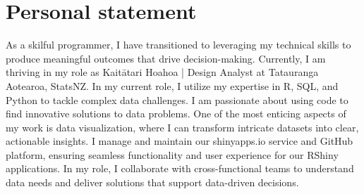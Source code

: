 \section{Personal statement}
As a skilful programmer, I have transitioned to leveraging my technical skills to produce meaningful outcomes that drive decision-making. 
Currently, I am thriving in my role as Kaitātari Hoahoa | Design Analyst at Tatauranga Aotearoa, StatsNZ. 
In my current role, I utilize my expertise in R, SQL, and Python to tackle complex data challenges. 
I am passionate about using code to find innovative solutions to data problems.
One of the most enticing aspects of my work is data visualization, where I can transform intricate datasets into clear, actionable insights. 
I manage and maintain our shinyapps.io service and GitHub platform, ensuring seamless functionality and user experience for our RShiny applications.
In my role, I collaborate with cross-functional teams to understand data needs and deliver solutions that support data-driven decisions. 